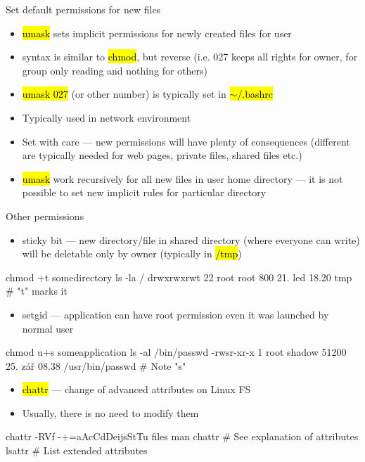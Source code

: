 \documentclass[compress, ucs, xelatex, 11pt, xcolor=svgnames,
  hyperref={
    bookmarks=true,
    unicode=true,
    colorlinks=true,
    pdftitle={Linux, command line and MetaCentrum},
    plainpages=false,
    pdfauthor={Vojtech Zeisek},
    pdfsubject={Course about use of Linux command line, writing shell scripts and using MetaCentrum of CESNET},
    pdfcreator={XeLaTeX, http://www.xelatex.org/},
    pdfkeywords={Linux, GNU, BASH, shell, command line, MetaCentrum},
    linkcolor=Sienna,
    anchorcolor=black,
    citecolor=green,
    filecolor=magenta,
    menucolor=Sienna,
    urlcolor=cyan,
    pdftex},
  url={hyphens, lowtilde} %
  ]{beamer}
\renewcommand{\texttt}[1]{\hl{\ttfamily #1}}
\begin{document}
\begin{frame}{Set default permissions for new files}
\begin{itemize}
  \item \texttt{umask} sets implicit permissions for newly created files for user
  \item syntax is similar to \texttt{chmod}, but reverse (i.e. 027 keeps all rights for owner, for group only reading and nothing for others)
  \item \texttt{umask 027} (or other number) is typically set in \texttt{$\sim$/.bashrc}
  \item Typically used in network environment
  \item Set with care --- new permissions will have plenty of consequences (different are typically needed for web pages, private files, shared files etc.)
  \item \texttt{umask} work recursively for all new files in user home directory --- it is not possible to set new implicit rules for particular directory
\end{itemize}
\end{frame}

\begin{frame}[fragile]{Other permissions}
\begin{itemize}
  \item sticky bit --- new directory/file in shared directory (where everyone can write) will be deletable only by owner (typically in \texttt{/tmp})
\end{itemize}
  \begin{bashcode}
    chmod +t somedirectory
    ls -la /
    drwxrwxrwt 22 root root 800 21. led 18.20 tmp # "t" marks it
  \end{bashcode}
\begin{itemize}
  \item setgid --- application can have root permission even it was launched by normal user
\end{itemize}
  \begin{bashcode}
    chmod u+s someapplication
    ls -al /bin/passwd
    -rwsr-xr-x 1 root shadow 51200 25. zář 08.38 /usr/bin/passwd # Note "s"
  \end{bashcode}
\begin{itemize}
  \item \texttt{chattr} --- change of advanced attributes on Linux FS
  \item Usually, there is no need to modify them
\end{itemize}
  \begin{bashcode}
    chattr -RVf -+=aAcCdDeijsStTu files
    man chattr # See explanation of attributes
    lsattr # List extended attributes
  \end{bashcode}
\end{frame}
\end{document}
